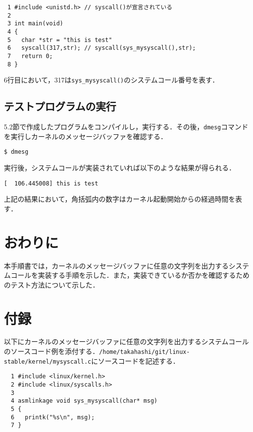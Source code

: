\documentclass[12pt]{jsarticle}
\begin{document}
\begin{verbatim}
 1 #include <unistd.h> // syscall()が宣言されている
 2
 3 int main(void)
 4 {
 5   char *str = "this is test"
 6   syscall(317,str); // syscall(sys_mysyscall(),str);
 7   return 0;
 8 } 
\end{verbatim}
6行目において，317は\verb|sys_mysyscall()|のシステムコール番号を表す．

\subsection{テストプログラムの実行}
5.2節で作成したプログラムをコンパイルし，実行する．その後，\verb|dmesg|コマンドを実行しカーネルのメッセージバッファを確認する．

\begin{verbatim}
$ dmesg
\end{verbatim}

実行後，システムコールが実装されていれば以下のような結果が得られる．
\begin{verbatim}
[  106.445008] this is test
\end{verbatim}
上記の結果において，角括弧内の数字はカーネル起動開始からの経過時間を表す．

\section{おわりに}
\label{sec:conclusion}
本手順書では，カーネルのメッセージバッファに任意の文字列を出力するシステムコールを実装する手順を示した．また，実装できているか否かを確認するためのテスト方法について示した．

\section{付録}
\label{appendix}
以下にカーネルのメッセージバッファに任意の文字列を出力するシステムコールのソースコード例を添付する．\verb|/home/takahashi/git/linux-stable/kernel/mysyscall.c|にソースコードを記述する．
\begin{verbatim}
  1 #include <linux/kernel.h> 
  2 #include <linux/syscalls.h>
  3
  4 asmlinkage void sys_mysyscall(char* msg)
  5 {
  6   printk("%s\n", msg); 
  7 }
\end{verbatim}




\end{document}
